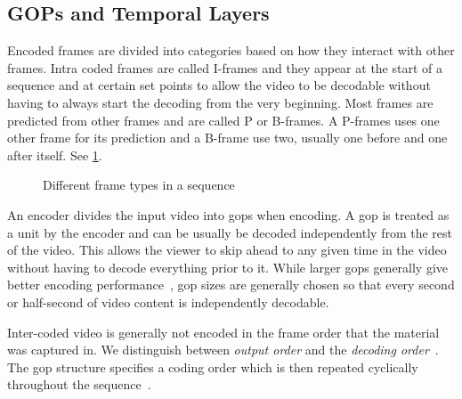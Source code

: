 \subsection{GOPs and Temporal Layers}
\label{subsec:gops-and-temporal-layers}
Encoded frames are divided into categories based on how they interact with other frames. Intra coded frames are called I-frames and they appear at the start of a sequence and at certain set points to allow the video to be decodable without having to always start the decoding from the very beginning. Most frames are predicted from other frames and are called P or B-frames. A P-frames uses one other frame for its prediction and a B-frame use two, usually one before and one after itself. See \cref{fig:frame_types}.

\begin{figure}
    \centering
        {}
    \caption{Different frame types in a sequence}
    \label{fig:frame_types}
\end{figure}

An encoder divides the input video into \glspl{gop} when encoding. A \gls{gop} is treated as a unit by the encoder and can be usually be decoded independently from the rest of the video. This allows the viewer to skip ahead to any given time in the video without having to decode everything prior to it. While larger \glspl{gop} generally give better encoding performance~\cite{johan}, \gls{gop} sizes are generally chosen so that every second or half-second of video content is independently decodable.


Inter-coded video is generally not encoded in the frame order that the material was captured in. We distinguish between \textit{output order} and the \textit{decoding order}~\cite{Wien_Coding_Tools}. The \gls{gop} structure specifies a coding order which is then repeated cyclically throughout the sequence~\cite{Wien_Coding_Tools}.

